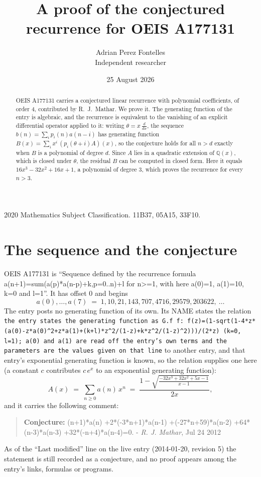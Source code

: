 \documentclass[11pt,a4paper]{article}
\title{A proof of the conjectured recurrence for OEIS A177131}
\author{Adrian Perez Fontelles\\ \small Independent researcher}
\date{25 August 2026}
\theoremstyle{plain}
\theoremstyle{definition}
\begin{document}
\maketitle

\begin{abstract}
OEIS A177131 carries a conjectured linear recurrence with polynomial coefficients, of
order 4, contributed by R.~J.~Mathar. We prove it. The generating function of the
entry is algebraic, and the recurrence is equivalent to the vanishing of an explicit
differential operator applied to it: writing $\theta=x\,\frac{d}{dx}$, the sequence
$b(n)=\sum_{i}p_{i}(n)a(n-i)$ has generating function
$B(x)=\sum_{i}x^{i}\,(p_{i}(\theta+i)A)(x)$, so the conjecture holds for all $n>d$ exactly
when $B$ is a polynomial of degree $d$. Since $A$ lies in a quadratic extension of
$\mathbb{Q}(x)$, which is closed under $\theta$, the residual $B$ can be computed in
closed form. Here it equals $16 x^{3} - 32 x^{2} + 16 x + 1$, a polynomial of degree $3$, which proves
the recurrence for every $n>3$.
\end{abstract}

\noindent\small 2020 Mathematics Subject Classification. 11B37, 05A15, 33F10.\normalsize

\section{The sequence and the conjecture}

OEIS A177131 is ``Sequence defined by the recurrence formula a(n+1)=sum(a(p)*a(n-p)+k,p=0..n)+l for n>=1, with here a(0)=1, a(1)=10, k=0 and l=1''. It has offset $0$ and begins
\[
a(0),\dots,a(7)\;=\;1, 10, 21, 143, 707, 4716, 29579, 203622,\ \dots
\]
The entry posts no generating function of its own. Its NAME states the
relation \texttt{the entry states the generating function as G.f f: f(z)=(1-sqrt(1-4*z*(a(0)-z*a(0)\textasciicircum{}2+z*a(1)+(k+l)*z\textasciicircum{}2/(1-z)+k*z\textasciicircum{}2/(1-z)\textasciicircum{}2)))/(2*z) (k=0, l=1); a(0) and a(1) are read off the entry's own terms and the parameters are the values given on that line} to another entry, and that entry's exponential generating
function is known, so the relation supplies one here (a constant $c$ contributes
$c\,e^{x}$ to an exponential generating function):
\begin{equation}\label{eq:gf}
A(x)\;=\;\sum_{n\ge 0} a(n)\,x^{n}\;=\;\frac{1 - \sqrt{\frac{- 32 x^{3} + 32 x^{2} + 5 x - 1}{x - 1}}}{2 x} ,
\end{equation}
and it carries the following comment:
\begin{quote}\small
\textbf{Conjecture:} (n+1)*a(n) +2*(-3*n+1)*a(n-1) +(-27*n+59)*a(n-2) +64*(n-3)*a(n-3) +32*(-n+4)*a(n-4)=0. - \emph{R. J. Mathar}, Jul 24 2012
\end{quote}
As of the ``Last modified'' line on the live entry (2014-01-20, revision 5) the
statement is still recorded as a conjecture, and no proof appears among the entry's links,
formulas or programs.
\end{document}
